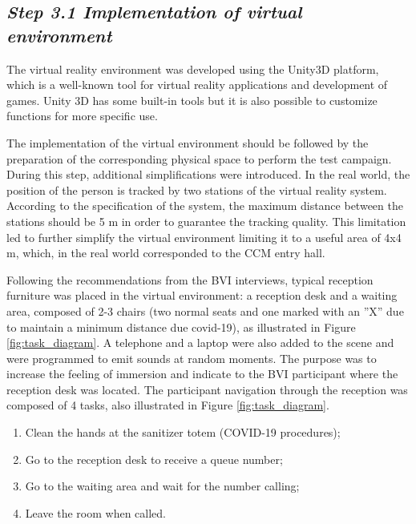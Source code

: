     \subsection*{\textit{Step 3.1 Implementation of virtual environment}}
    \label{subsec:virtual_world_creation}

        The virtual reality environment was developed using the Unity3D platform, which is a well-known tool for virtual reality applications and development of games. Unity 3D has some built-in tools but it is also possible to customize functions for more specific use\cite{wang2010new}.
    
        The implementation of the virtual environment should be followed by the preparation of the corresponding physical space to perform the test campaign. During this step, additional simplifications were introduced. In the real world, the position of the person is tracked by two stations of the virtual reality system. According to the specification of the system, the maximum distance between the stations should be 5 m in order to guarantee the tracking quality. This limitation led to further simplify the virtual environment limiting it to a useful area of 4x4 m, which, in the real world corresponded to the CCM entry hall. 
        
        Following the recommendations from the BVI interviews, typical reception furniture was placed in the virtual environment: a reception desk and a waiting area, composed of 2-3 chairs (two normal seats and one marked with an ”X” due to maintain a minimum distance due covid-19), as illustrated in Figure \ref{fig:task_diagram}. A telephone and a laptop were also added to the scene and were programmed to emit sounds at random moments. The purpose was to increase the feeling of immersion and indicate to the BVI participant where the reception desk was located.
        The participant navigation through the reception was composed of 4 tasks, also illustrated in Figure \ref{fig:task_diagram}.
        
        \begin{enumerate}
            \item Clean the hands at the sanitizer totem (COVID-19 procedures);
            \item Go to the reception desk to receive a queue number;
            \item Go to the waiting area and wait for the number calling;
            \item Leave the room when called.
        \end{enumerate}
        
